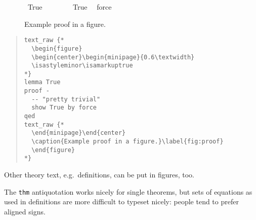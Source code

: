 \begin{isabellebody}
\begin{figure}
\begin{center}
\begin{minipage}{0.6\textwidth}
  \isastyleminor\isamarkuptrue
{}\isamarkupfalse%
\ True\isanewline
%
\isadelimproof
%
\endisadelimproof
%
\isatagproof
{}\isamarkupfalse%
\ {\isacharminus}\isanewline
\ \ %
\isanewline
\ \ \isamarkupfalse%
\ True\ \isamarkupfalse%
\ force\isanewline
{}\isamarkupfalse%
%
\endisatagproof
{\isafoldproof}%
%
\isadelimproof
%
\endisadelimproof
%
\end{minipage}\end{center}
  \caption{Example proof in a figure.}\label{fig:proof}
  \end{figure}
%
\begin{isamarkuptext}%
\begin{quote}
\small
\verb!text_raw {!\verb!*!\\
\verb!  \begin{figure}!\\
\verb!  \begin{center}\begin{minipage}{0.6\textwidth}!\\
\verb!  \isastyleminor\isamarkuptrue!\\
\verb!*!\verb!}!\\
\verb!lemma True!\\
\verb!proof -!\\
\verb!  -- "pretty trivial"!\\
\verb!  show True by force!\\
\verb!qed!\\
\verb!text_raw {!\verb!*!\\
\verb!  \end{minipage}\end{center}!\\
\verb!  \caption{Example proof in a figure.}\label{fig:proof}!\\
\verb!  \end{figure}!\\
\verb!*!\verb!}!
\end{quote}

Other theory text, e.g.\ definitions, can be put in figures, too.%
\end{isamarkuptext}%
\isamarkuptrue%
%
\isamarkuptrue%
%
\begin{isamarkuptext}%
The \verb!thm! antiquotation works nicely for single theorems, but
  sets of equations as used in definitions are more difficult to
  typeset nicely: people tend to prefer aligned \isa{{\isacharequal}} signs.


\end{isamarkuptext}
\end{isabellebody}
